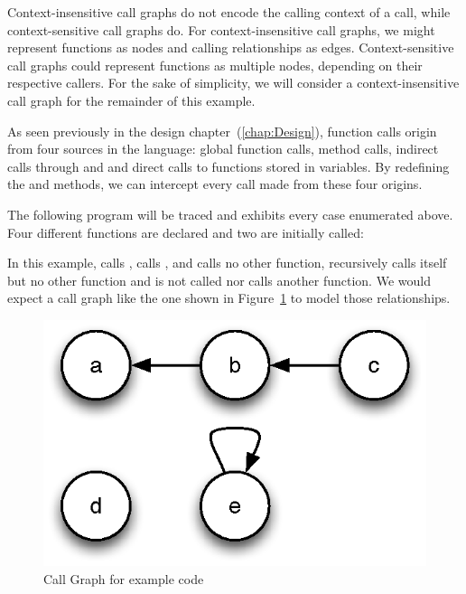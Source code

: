 Context-insensitive call graphs do not encode the calling context of a call,
while context-sensitive call graphs do. For context-insensitive call graphs, we
might represent functions as nodes and calling relationships as edges.
Context-sensitive call graphs could represent functions as multiple nodes,
depending on their respective callers. For the sake of simplicity, we will
consider a context-insensitive call graph for the remainder of this example. 

As seen previously in the design chapter~(\ref{chap:Design}), function calls
origin from four sources in the language: global function calls, method calls,
indirect calls through  and  and direct calls to functions
stored in variables. By redefining the  and  methods, we can
intercept every call made from these four origins.

The following program will be traced and exhibits every case enumerated
above. Four different functions are declared and two are initially called:


In this example,  calls ,  calls , and  calls no
other function,  recursively calls itself but no other function and
 is not called nor calls another function. We would expect a call graph
like the one shown in Figure~\ref{fig:CallGraph} to model those relationships.

\begin{figure}[htb]
\begin{center}
\includegraphics{figures/callgraph}
\caption{\label{fig:CallGraph} Call Graph for example code}
\end{center}
\end{figure}

